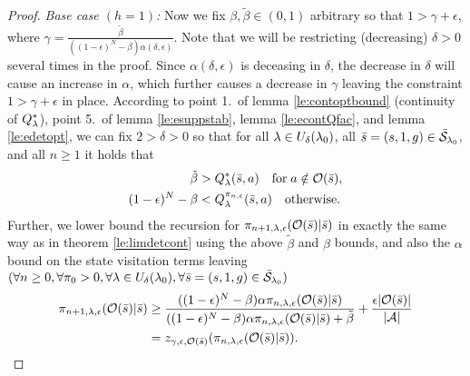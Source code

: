 \begin{proof}
\emph{Base case $(h=1)$:}
Now we fix $\beta,\tilde{\beta} \in (0,1)$ arbitrary so that
$1> \gamma + \epsilon$, where $\gamma = \frac{\tilde{\beta}}{((1-\epsilon)^N-\beta)\alpha(\delta,\epsilon)}$.
Note that we will be restricting (decreasing) $\delta>0$
several times in the proof.
Since $\alpha(\delta,\epsilon)$ is deceasing in $\delta$, the decrease in $\delta$ will cause an increase in $\alpha$, which further causes a decrease in $\gamma$ leaving the constraint $1> \gamma + \epsilon$ in place.
According to 
point 1.\ of lemma \ref{le:contoptbound} (continuity of $Q^*_{\mathit{\lambda}}$),
point 5.\ of lemma \ref{le:esuppstab},
 lemma \ref{le:econtQfac}, and lemma \ref{le:edetopt}, we can fix $2>\delta >0$
so that for all $\mathit{\lambda} \in U_{\delta}(\mathit{\lambda}_0)$,
all $\bar{s} = (s,1,g) \in \bar{\mathcal{S}}_{\mathit{\lambda}_0}$, and all $n\geq 1$ it holds that
$$
\begin{aligned}
\tilde{\beta}  &> Q_{\mathit{\lambda}}^*(\bar{s},a)\quad \text{for}\; a\notin \mathcal{O}(\bar{s}),
\\
(1-\epsilon)^N - \beta &< Q_{\mathit{\lambda}}^{\pi_{n,\epsilon}}(\bar{s},a) \quad \text{otherwise.}
\end{aligned}
$$
Further, we lower bound the recursion for $\pi_{n+1,\mathit{\lambda},\epsilon}(\mathcal{O}(\bar{s})|\bar{s})$ in exactly
the same way as in theorem \ref{le:limdetcont} using the above $\tilde{\beta}$ and $\beta$ bounds, and also the $\alpha$ bound on the 
state visitation terms leaving $(\forall n \geq 0, \forall \pi_0 >0, \forall \mathit{\lambda} \in U_{\delta}(\mathit{\lambda}_0),\forall \bar{s} = (s,1,g) \in \bar{\mathcal{S}}_{\mathit{\lambda}_0} )$
\begin{align}
\pi_{n+1,\mathit{\lambda},\epsilon}(\mathcal{O}(\bar{s})|\bar{s})
&\geq
\frac{((1-\epsilon)^N-\beta)\alpha \pi_{n,\mathit{\lambda},\epsilon}(\mathcal{O}(\bar{s})|\bar{s})}
{((1-\epsilon)^N-\beta)\alpha \pi_{n,\mathit{\lambda},\epsilon}(\mathcal{O}(\bar{s})|\bar{s}) + \tilde{\beta}}
+
\frac{\epsilon |\mathcal{O}(\bar{s})|}{|\mathcal{A}|}
\nonumber\\
&=
z_{\gamma,\epsilon,\mathcal{O}(\bar{s})} (\pi_{n,\mathit{\lambda},\epsilon}(\mathcal{O}(\bar{s})|\bar{s})).
\label{eq:epimf1}
\end{align}


\end{proof}
